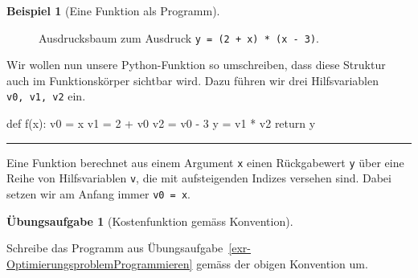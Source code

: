 \documentclass[
  a4paper,
  DIV=11]{scrreprt}
\newenvironment{Shaded}{\begin{snugshade}}{\end{snugshade}}
\newcommand{\ControlFlowTok}[1]{\textcolor[rgb]{0.00,0.23,0.31}{#1}}
\newcommand{\DecValTok}[1]{\textcolor[rgb]{0.68,0.00,0.00}{#1}}
\newcommand{\KeywordTok}[1]{\textcolor[rgb]{0.00,0.23,0.31}{#1}}
\newcommand{\NormalTok}[1]{\textcolor[rgb]{0.00,0.23,0.31}{#1}}
\newcommand{\OperatorTok}[1]{\textcolor[rgb]{0.37,0.37,0.37}{#1}}
\theoremstyle{definition}
\newtheorem{exercise}{Übungsaufgabe}[chapter]
\theoremstyle{definition}
\newtheorem{example}{Beispiel}[chapter]
\theoremstyle{remark}
\begin{document}
\begin{example}[Eine Funktion als
Programm]
\begin{figure}
{\begin{figure}[H]
{}

\end{figure}

}

\caption{\label{fig-compTreeSimple}Ausdrucksbaum zum Ausdruck
\texttt{y\ =\ (2\ +\ x)\ *\ (x\ -\ 3)}.}

\end{figure}

Wir wollen nun unsere Python-Funktion so umschreiben, dass diese
Struktur auch im Funktionskörper sichtbar wird. Dazu führen wir drei
Hilfsvariablen \texttt{v0,\ v1,\ v2} ein.

\begin{Shaded}
\begin{Highlighting}[]
\KeywordTok{def}\NormalTok{ f(x):}
\NormalTok{    v0 }\OperatorTok{=}\NormalTok{ x}
\NormalTok{    v1 }\OperatorTok{=} \DecValTok{2} \OperatorTok{+}\NormalTok{ v0}
\NormalTok{    v2 }\OperatorTok{=}\NormalTok{ v0 }\OperatorTok{{-}} \DecValTok{3}
\NormalTok{    y }\OperatorTok{=}\NormalTok{ v1 }\OperatorTok{*}\NormalTok{ v2}
    \ControlFlowTok{return}\NormalTok{ y}
\end{Highlighting}
\end{Shaded}

\end{example}

\begin{center}\rule{0.5\linewidth}{0.5pt}\end{center}

\begin{tcolorbox}[enhanced jigsaw, titlerule=0mm, title=\textcolor{quarto-callout-important-color}{\faExclamation}\hspace{0.5em}{Konvention}, breakable, coltitle=black, leftrule=.75mm, bottomrule=.15mm, colback=white, rightrule=.15mm, opacitybacktitle=0.6, bottomtitle=1mm, toptitle=1mm, left=2mm, toprule=.15mm, colbacktitle=quarto-callout-important-color!10!white, colframe=quarto-callout-important-color-frame, arc=.35mm, opacityback=0]

Eine Funktion berechnet aus einem Argument \texttt{x} einen Rückgabewert
\texttt{y} über eine Reihe von Hilfsvariablen \texttt{v}, die mit
aufsteigenden Indizes versehen sind. Dabei setzen wir am Anfang immer
\texttt{v0\ =\ x}.

\end{tcolorbox}

\begin{exercise}[Kostenfunktion gemäss
Konvention]\protect\hypertarget{exr-OptimierungsproblemNachKonvention}{}\label{exr-OptimierungsproblemNachKonvention}

Schreibe das Programm aus
Übungsaufgabe~\ref{exr-OptimierungsproblemProgrammieren} gemäss der
obigen Konvention um.

\end{exercise}
\end{document}
